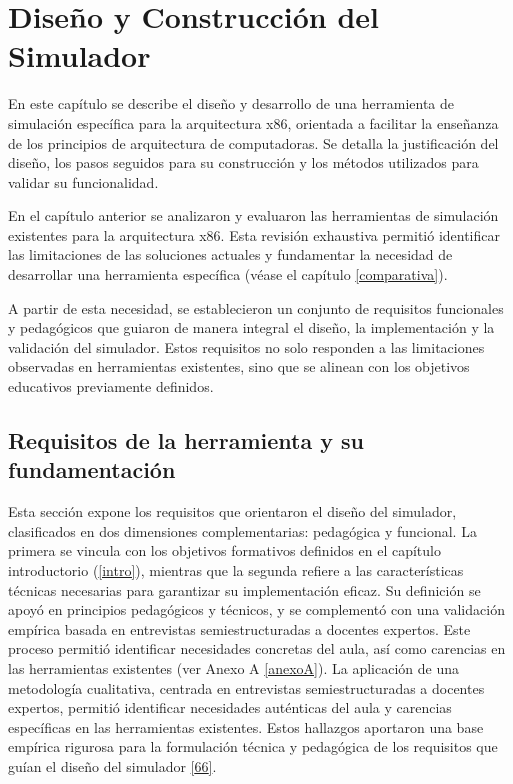 \documentclass[12pt,oneside]{templates/unerthesis}
\begin{document}
\hypertarget{desarrollo}{%
\chapter{Diseño y Construcción del Simulador}\label{desarrollo}}

En este capítulo se describe el diseño y desarrollo de una herramienta de simulación específica para la arquitectura x86, orientada a facilitar la enseñanza de los principios de arquitectura de computadoras. Se detalla la justificación del diseño, los pasos seguidos para su construcción y los métodos utilizados para validar su funcionalidad.

En el capítulo anterior se analizaron y evaluaron las herramientas de simulación existentes para la arquitectura x86. Esta revisión exhaustiva permitió identificar las limitaciones de las soluciones actuales y fundamentar la necesidad de desarrollar una herramienta específica (véase el capítulo \ref{comparativa}).

A partir de esta necesidad, se establecieron un conjunto de requisitos funcionales y pedagógicos que guiaron de manera integral el diseño, la implementación y la validación del simulador. Estos requisitos no solo responden a las limitaciones observadas en herramientas existentes, sino que se alinean con los objetivos educativos previamente definidos.

\hypertarget{requisitos-de-la-herramienta-y-su-fundamentaciuxf3n}{%
\section{Requisitos de la herramienta y su fundamentación}\label{requisitos-de-la-herramienta-y-su-fundamentaciuxf3n}}

Esta sección expone los requisitos que orientaron el diseño del simulador, clasificados en dos dimensiones complementarias: pedagógica y funcional. La primera se vincula con los objetivos formativos definidos en el capítulo introductorio (\ref{intro}), mientras que la segunda refiere a las características técnicas necesarias para garantizar su implementación eficaz. Su definición se apoyó en principios pedagógicos y técnicos, y se complementó con una validación empírica basada en entrevistas semiestructuradas a docentes expertos. Este proceso permitió identificar necesidades concretas del aula, así como carencias en las herramientas existentes (ver Anexo A \ref{anexoA}). La aplicación de una metodología cualitativa, centrada en entrevistas semiestructuradas a docentes expertos, permitió identificar necesidades auténticas del aula y carencias específicas en las herramientas existentes. Estos hallazgos aportaron una base empírica rigurosa para la formulación técnica y pedagógica de los requisitos que guían el diseño del simulador \protect\hyperlink{ref-huberman2019qualitative}{{[}66{]}}.
\end{document}
